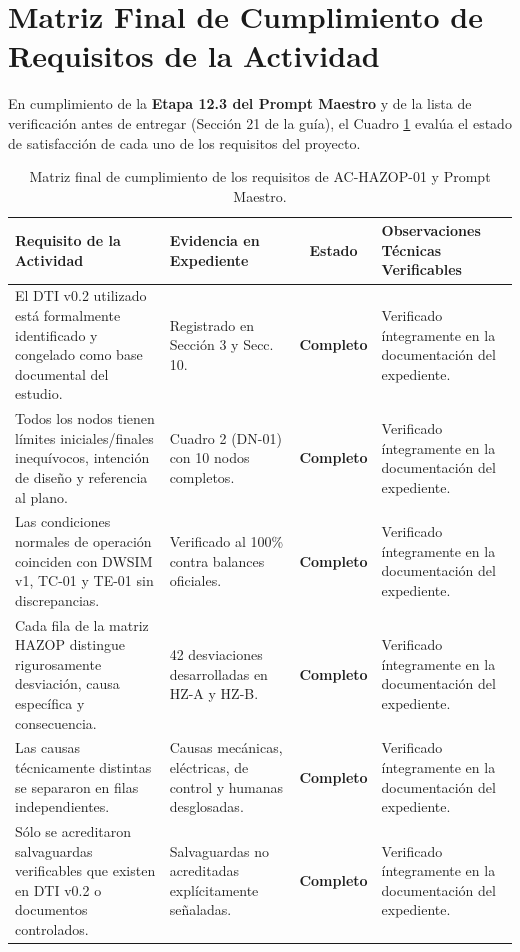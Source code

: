 \documentclass[10pt,letterpaper]{article}
\begin{document}
\section{Matriz Final de Cumplimiento de Requisitos de la Actividad}
En cumplimiento de la \textbf{Etapa 12.3 del Prompt Maestro} y de la lista de verificación antes de entregar (Sección 21 de la guía), el Cuadro \ref{tab:cumplimiento_final} evalúa el estado de satisfacción de cada uno de los requisitos del proyecto.

\begin{table}[H]
\centering\small
\caption{Matriz final de cumplimiento de los requisitos de AC-HAZOP-01 y Prompt Maestro.} \label{tab:cumplimiento_final}
\begin{tabularx}{\textwidth}{|p{5.5cm}|p{2.8cm}|c|X|}
\hline
\rowcolor{tableheader}\color{white}\textbf{Requisito de la Actividad} & \color{white}\textbf{Evidencia en Expediente} & \color{white}\textbf{Estado} & \color{white}\textbf{Observaciones Técnicas Verificables} \\ \hline
El DTI v0.2 utilizado está formalmente identificado y congelado como base documental del estudio. & Registrado en Sección 3 y Secc. 10. & \textbf{Completo} & Verificado íntegramente en la documentación del expediente. \\ \hline
Todos los nodos tienen límites iniciales/finales inequívocos, intención de diseño y referencia al plano. & Cuadro 2 (DN-01) con 10 nodos completos. & \textbf{Completo} & Verificado íntegramente en la documentación del expediente. \\ \hline
Las condiciones normales de operación coinciden con DWSIM v1, TC-01 y TE-01 sin discrepancias. & Verificado al 100\% contra balances oficiales. & \textbf{Completo} & Verificado íntegramente en la documentación del expediente. \\ \hline
Cada fila de la matriz HAZOP distingue rigurosamente desviación, causa específica y consecuencia. & 42 desviaciones desarrolladas en HZ-A y HZ-B. & \textbf{Completo} & Verificado íntegramente en la documentación del expediente. \\ \hline
Las causas técnicamente distintas se separaron en filas independientes. & Causas mecánicas, eléctricas, de control y humanas desglosadas. & \textbf{Completo} & Verificado íntegramente en la documentación del expediente. \\ \hline
Sólo se acreditaron salvaguardas verificables que existen en DTI v0.2 o documentos controlados. & Salvaguardas no acreditadas explícitamente señaladas. & \textbf{Completo} & Verificado íntegramente en la documentación del expediente. \\ \hline

\end{tabularx}
\end{table}
\end{document}
